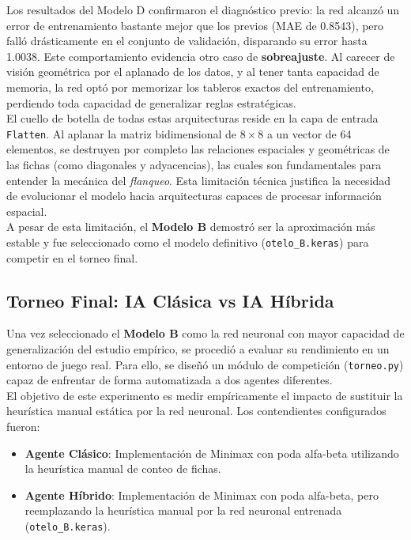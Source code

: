 \documentclass[conference]{IEEEtran}
\begin{document}
Los resultados del Modelo D confirmaron el diagnóstico previo: la red alcanzó 
un error de entrenamiento bastante mejor que los previos (MAE de 0.8543), pero falló drásticamente en el conjunto de validación, disparando su error hasta 1.0038. Este comportamiento 
evidencia otro caso de \textbf{sobreajuste}. Al carecer de visión geométrica por el aplanado de los datos, y al tener tanta capacidad de memoria, la red optó por memorizar los tableros 
exactos del entrenamiento, perdiendo toda capacidad de generalizar reglas estratégicas. \\

El cuello de botella de todas estas arquitecturas reside en la capa de entrada \texttt{Flatten}. Al aplanar la matriz bidimensional de $8 \times 8$ a un vector de 64 elementos, 
se destruyen por completo las relaciones espaciales y geométricas de las fichas (como diagonales y adyacencias), las cuales son fundamentales para entender la mecánica 
del \textit{flanqueo}. Esta limitación técnica justifica la necesidad de evolucionar el modelo hacia arquitecturas capaces de procesar información espacial.\\

A pesar de esta limitación, el \textbf{Modelo B} demostró ser la aproximación más estable y fue seleccionado como el modelo definitivo (\texttt{otelo\_B.keras}) para competir en el torneo final.

\subsection{Torneo Final: IA Clásica vs IA Híbrida}
Una vez seleccionado el \textbf{Modelo B} como la red neuronal con mayor capacidad de generalización del estudio empírico, 
se procedió a evaluar su rendimiento en un entorno de juego real. Para ello, se diseñó un módulo de competición (\texttt{torneo.py}) capaz de enfrentar de forma automatizada 
a dos agentes diferentes.\\

El objetivo de este experimento es medir empíricamente el impacto de sustituir la heurística manual estática por la red neuronal. Los 
contendientes configurados fueron:\\
\begin{itemize}
    \item \textbf{Agente Clásico}: Implementación de Minimax con poda alfa-beta utilizando la heurística manual de conteo de fichas.
    \item \textbf{Agente Híbrido}: Implementación de Minimax con poda alfa-beta, pero reemplazando la heurística manual por la red neuronal entrenada (\texttt{otelo\_B.keras}).\\
\end{itemize}
\end{document}
